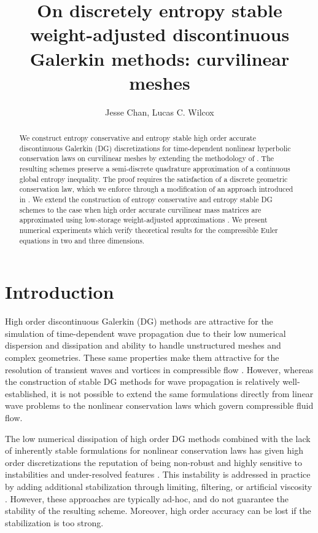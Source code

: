 \documentclass[10pt]{amsart}
\date{}
\author{Jesse Chan, Lucas C. Wilcox}
\title{On discretely entropy stable weight-adjusted discontinuous Galerkin methods: curvilinear meshes}%
\theoremstyle{definition}
\theoremstyle{lemma}
\theoremstyle{theorem}
\theoremstyle{assumption}
\begin{document}
\maketitle

\begin{abstract}
We construct entropy conservative and entropy stable high order accurate discontinuous Galerkin (DG) discretizations for time-dependent nonlinear hyperbolic conservation laws on curvilinear meshes by extending the methodology of \cite{chan2017discretely}.  The resulting schemes preserve a semi-discrete quadrature approximation of a continuous global entropy inequality.  The proof requires the satisfaction of a discrete geometric conservation law, which we enforce through a modification of an approach introduced in \cite{kopriva2006metric}.  We extend the construction of entropy conservative and entropy stable DG schemes to the case when high order accurate curvilinear mass matrices are approximated using low-storage weight-adjusted approximations \cite{chan2016weight1, chan2016weight2}.  We present numerical experiments which verify theoretical results for the compressible Euler equations in two and three dimensions.
\end{abstract}


\section{Introduction}

High order discontinuous Galerkin (DG) methods are attractive for the simulation of time-dependent wave propagation due to their low numerical dispersion and dissipation \cite{hu1999analysis, ainsworth2004dispersive} and ability to handle unstructured meshes and complex geometries.  These same properties make them attractive for the resolution of transient waves and vortices in compressible flow \cite{wang2013high}.  However, whereas the construction of stable DG methods for wave propagation is relatively well-established, it is not possible to extend the same formulations directly from linear wave problems to the nonlinear conservation laws which govern compressible fluid flow.  

The low numerical dissipation of high order DG methods combined with the lack of inherently stable formulations for nonlinear conservation laws has given high order discretizations the reputation of being non-robust and highly sensitive to instabilities and under-resolved features \cite{wang2013high}.  This instability is addressed in practice by adding additional stabilization through limiting, filtering, or artificial viscosity \cite{persson2006sub, krivodonova2007limiters, barter2010shock, guermond2011entropy}.  However, these approaches are typically ad-hoc, and do not guarantee the stability of the resulting scheme.  Moreover, high order accuracy can be lost if the stabilization is too strong.  
\end{document}
